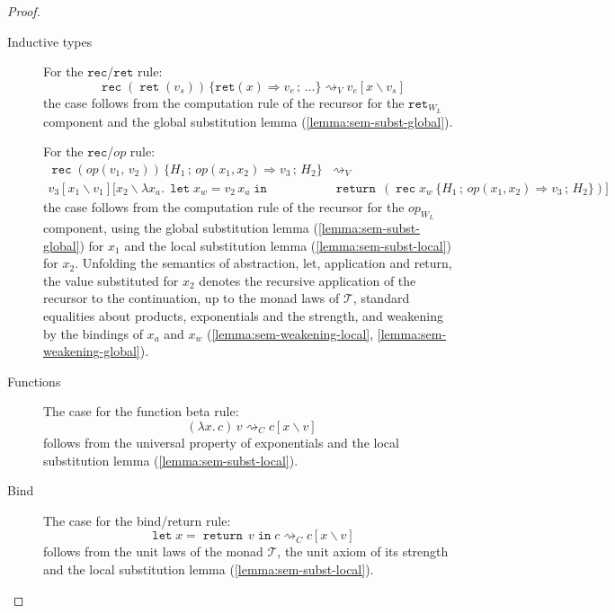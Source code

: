\documentclass[acmsmall, screen, review, anonymous]{acmart}
\theoremstyle{definition}
\newcommand{\mon}{\mathcal{T}}
\newcommand{\ind}[1]{W_{#1}}
\newcommand{\indintro}[3]{{#1}(#2,\, #3)}
\newcommand{\retname}{\mathtt{ret}}
\newcommand{\ret}[1]{\mathop{\retname}(#1)}
\newcommand{\indelimname}{\mathtt{rec}}
\newcommand{\indelim}[2]{\mathop{\indelimname} #1 \,\{#2\}}
\newcommand{\indretcase}[2]{\retname(#1) \Rightarrow #2}
\newcommand{\indcase}[4]{#1(#2, #3) \Rightarrow #4}
\newcommand{\seq}{\,;\,}
\newcommand{\retcw}[1]{\retname_{\ind{#1}}}
\newcommand{\opcw}[2]{{#1}_{\ind{#2}}}
\newcommand{\abs}[2]{\lambda#1.\,#2}
\newcommand{\app}[2]{#1\,#2}
\newcommand{\returnname}{\mathop{\mathtt{return}}}
\newcommand{\return}[1]{\returnname\, #1}
\newcommand{\letvname}{\mathop{\mathtt{let}}}
\newcommand{\letv}[3]{\letvname #1 = #2 \mathop{\mathtt{in}} #3}
\newcommand{\sub}[2]{[#1\backslash#2]}
\newcommand{\sbst}[3]{#1\sub{#2}{#3}}
\newcommand{\stepstoname}{\rightsquigarrow}
\newcommand{\stepstov}{\stepstoname_V}
\newcommand{\stepstoc}{\stepstoname_C}
\begin{document}
\begin{proof}
\begin{description}
  \item[Inductive types]
    For the $\indelimname$/$\retname$ rule:
    \begin{equation*}
      \indelim{(\ret{v_s})}{\indretcase{x}{v_e} \seq \ldots} \stepstov \sbst{v_e}{x}{v_s}
    \end{equation*}
    the case follows from the computation rule of the recursor
    for the $\retcw{L}$ component and the global
    substitution lemma (\ref{lemma:sem-subst-global}).

    For the $\indelimname$/$op$ rule:
    \begin{align*}
      \indelim{(\indintro{op}{v_1}{v_2})}{H_1 \seq \indcase{op}{x_1}{x_2}{v_3} \seq H_2} &\stepstov \\
      \sbst{\sbst{v_3}{x_1}{v_1}}
      {x_2}{\abs{x_a}{\letv{x_w}{\app{v_2}{x_a}}{&\return{(\indelim{x_w}{H_1 \seq \indcase{op}{x_1}{x_2}{v_3} \seq H_2})}}}}
    \end{align*}
    the case follows from the computation rule of the recursor
    for the $\opcw{op}{L}$ component, using the global
    substitution lemma (\ref{lemma:sem-subst-global}) for $x_1$ and the
    local substitution lemma (\ref{lemma:sem-subst-local}) for
    $x_2$. Unfolding the semantics of abstraction, let, application and
    return, the value substituted for $x_2$ denotes the recursive
    application of the recursor to the continuation, up to the monad
    laws of $\mon$, standard equalities about products, exponentials and
    the strength, and weakening by the bindings of $x_a$ and $x_w$
    (\ref{lemma:sem-weakening-local}, \ref{lemma:sem-weakening-global}).

  \item[Functions]
    The case for the function beta rule:
    \begin{equation*}
      \app{(\abs{x}{c})}{v} \stepstoc \sbst{c}{x}{v}
    \end{equation*}
    follows from the universal property of exponentials and the local
    substitution lemma (\ref{lemma:sem-subst-local}).

  \item[Bind]
    The case for the bind/return rule:
    \begin{equation*}
      \letv{x}{\return{v}}{c} \stepstoc \sbst{c}{x}{v}
    \end{equation*}
    follows from the unit laws of the monad $\mon$, the unit axiom of
    its strength and the local substitution lemma
    (\ref{lemma:sem-subst-local}).


\end{description}
\end{proof}
\end{document}
